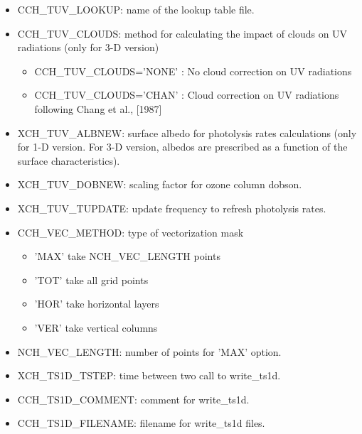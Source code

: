\begin{itemize}
\item  CCH\_TUV\_LOOKUP: name of the lookup table file.

\item  CCH\_TUV\_CLOUDS: method for calculating the impact of clouds on UV radiations (only for 3-D version)
\begin{itemize}

           \item CCH\_TUV\_CLOUDS='NONE' : No cloud correction on UV radiations
           \item CCH\_TUV\_CLOUDS='CHAN' : Cloud correction on UV radiations following Chang et al., [1987]
\end{itemize}

\item  XCH\_TUV\_ALBNEW: surface albedo for photolysis rates calculations (only for 1-D version. For 3-D version, albedos are prescribed as a function of the surface characteristics).

\item  XCH\_TUV\_DOBNEW: scaling factor for ozone column dobson.

\item  XCH\_TUV\_TUPDATE: update frequency to refresh photolysis rates.

\item  CCH\_VEC\_METHOD: type of vectorization mask
\begin{itemize}
          \item 'MAX' take NCH\_VEC\_LENGTH points
          \item 'TOT' take all grid points
          \item 'HOR' take horizontal layers
          \item 'VER' take vertical columns
\end{itemize}

\item  NCH\_VEC\_LENGTH: number of points for 'MAX' option.

 \item  XCH\_TS1D\_TSTEP: time between two call to write\_ts1d.

\item  CCH\_TS1D\_COMMENT: comment for write\_ts1d.

\item  CCH\_TS1D\_FILENAME: filename for write\_ts1d files.

\end{itemize}

